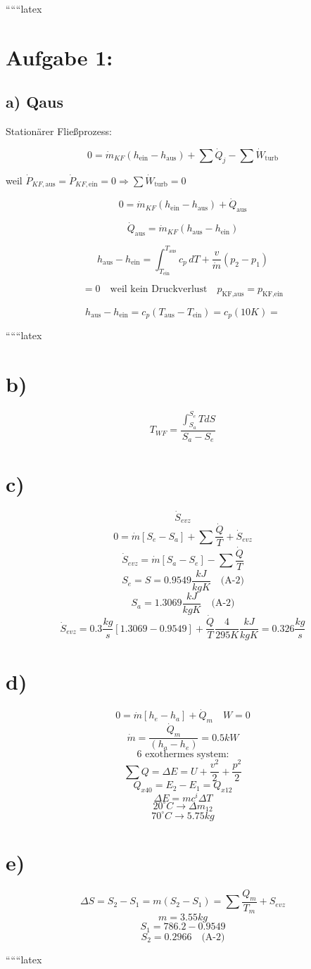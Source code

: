 
``````latex


\section*{Aufgabe 1:}
\subsection*{a) Qaus}

Stationärer Fließprozess:

\[
0 = \dot{m}_{KF} (h_{\text{ein}} - h_{\text{aus}}) + \sum \dot{Q}_j - \sum \dot{W}_{\text{turb}}
\]

weil \(\dot{P}_{KF,\text{aus}} = \dot{P}_{KF,\text{ein}} = 0 \Rightarrow \sum \dot{W}_{\text{turb}} = 0\)

\[
0 = \dot{m}_{KF} (h_{\text{ein}} - h_{\text{aus}}) + \dot{Q}_{\text{aus}}
\]

\[
\dot{Q}_{\text{aus}} = \dot{m}_{KF} (h_{\text{aus}} - h_{\text{ein}})
\]

\[
h_{\text{aus}} - h_{\text{ein}} = \int_{T_{\text{ein}}}^{T_{\text{aus}}} c_p \, dT + \frac{v}{\dot{m}} (p_2 - p_1)
\]

\[
= 0 \quad \text{weil kein Druckverlust} \quad p_{\text{KF,aus}} = p_{\text{KF,ein}}
\]

\[
h_{\text{aus}} - h_{\text{ein}} = c_p (T_{\text{aus}} - T_{\text{ein}}) = c_p (10K) =
\]

``````latex

\section*{b)}
\[
T_{WF} = \frac{\int_{S_a}^{S_e} T dS}{S_a - S_e}
\]

\section*{c)}
\[
\dot{S}_{evz}
\]
\[
0 = \dot{m} [S_e - S_a] + \sum \frac{\dot{Q}}{T} + \dot{S}_{evz}
\]
\[
\dot{S}_{evz} = \dot{m} [S_a - S_e] - \sum \frac{\dot{Q}}{T}
\]
\[
S_e = S = 0.9549 \frac{kJ}{kgK} \quad \text{(A-2)}
\]
\[
S_a = 1.3069 \frac{kJ}{kgK} \quad \text{(A-2)}
\]
\[
\dot{S}_{evz} = 0.3 \frac{kg}{s} \left[ 1.3069 - 0.9549 \right] + \frac{\dot{Q}}{T} \frac{4}{295K} \frac{kJ}{kgK} = 0.326 \frac{kg}{s}
\]

\section*{d)}
\[
0 = \dot{m} \left[ h_e - h_a \right] + \dot{Q}_m \quad W = 0
\]
\[
\dot{m} = \frac{\dot{Q}_m}{(h_a - h_e)} = 0.5 kW
\]
\[
\text{6 exothermes system:}
\]
\[
\sum Q = \Delta E = U + \frac{v^2}{2} + \frac{p^2}{2}
\]
\[
Q_{x40} = E_2 - E_1 = Q_{x12}
\]
\[
\Delta E = mc^i \Delta T
\]
\[
20^\circ C \rightarrow \Delta m_{12}
\]
\[
70^\circ C \rightarrow 5.75 kg
\]

\section*{e)}
\[
\Delta S = S_2 - S_1 = m (S_2 - S_1) = \sum \frac{Q_m}{T_m} + S_{evz}
\]
\[
m = 3.55 kg
\]
\[
S_1 = 786.2 - 0.9549
\]
\[
S_2 = 0.2966 \quad \text{(A-2)}
\]

``````latex


